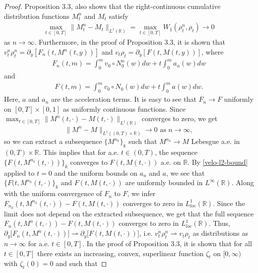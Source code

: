 \documentclass[11pt]{article}
\numberwithin{equation}{section}
\begin{document}
\begin{proof}
            Proposition 3.3, \cite{Tudorascu-2008} also shows that the right-continuous cumulative distribution functions $M_t^n$ and $M_t$ satisfy 
            \begin{align}\label{CDF-condition}
                \max_{t\in[0,T]}\|M_t^n-M_t\|_{L^1(\mathbb{R})}=\max_{t\in[0,T]}W_1(\rho_t^n,\rho_t)\to0
            \end{align}
            as $n\to\infty$. Furthermore, in the proof of Proposition 3.3, \cite{Tudorascu-2008} it is shown that $v_t^n\rho_t^n=\partial_y[{F}_n(t,M^n(t,y))]$ and $v_t\rho_t=\partial_y[{F}(t,M(t,y))]$, where 
            \begin{align*}
                {F}_n(t,m)=\int_0^m v_0\circ N_0^n(w)dw+t\int_0^ma_n(w)dw
            \end{align*}
            and
            \begin{align*}
                {F}(t,m)=\int_0^m v_0\circ N_0 (w)dw+t\int_0^ma(w)dw.
            \end{align*}
            Here, $a$ and $a_n$ are the acceleration terms.
            It is easy to see that ${F}_n\to{F}$ uniformly on $[0,T]\times[0,1]$ as uniformly continuous functions. 
            Since $\max_{t\in[0,T]}\|M^n(t,\cdot)-M(t,\cdot)\|_{L^1(\mathbb{R})}$ converges to zero, we get $$\|M^n-M\|_{L^1((0,T)\times\mathbb{R})}\rightarrow0\mbox{ as }n\rightarrow\infty,$$ 
            so we can extract a subsequence $\{M^{n_k}\}_k$ such that $M^{n_k}\rightarrow M$ Lebesgue a.e. in $(0,T)\times\mathbb{R}$. This implies that for a.e. $t\in(0,T)$, the sequence $\{F(t,M^{n_k}(t,\cdot))\}_k$ converges to $F(t,M(t,\cdot))$ a.e. on $\mathbb{R}$. By \eqref{velo-l2-bound} applied to $t=0$ and the uniform bounds on $a_n$ and $a$, we see that $\{F(t,M^{n_k}(t,\cdot)\}_k$ and $F(t,M(t,\cdot))$ are uniformly bounded in $L^\infty(\mathbb{R})$.
            Along with the uniform convergence of $F_n$ to $F$, we infer ${F}_{n_k}(t,M^{n_k}(t,\cdot))-{F}(t,M(t,\cdot))$ converges to zero in $L^1_{loc}(\mathbb{R})$. Since the limit does not depend on the extracted subsequence, we get that the full sequence ${F}_{n}(t,M^{n}(t,\cdot))-{F}(t,M(t,\cdot))$ converges to zero in $L^1_{loc}(\mathbb{R})$. Thus, $\partial_y\big[{F}_n(t,M^n(t,\cdot))\big]\rightharpoonup\partial_y\big[{F}(t,M(t,\cdot))\big]$, i.e. $v_t^n\rho_t^n\rightharpoonup v_t\rho_t$ as distributions as $n\to\infty$ for a.e. $t\in[0,T]$.  In the proof of Proposition 3.3, \cite{Tudorascu-2008} it is shown that for all $t\in[0,T]$ there exists an increasing, convex, superlinear function $\zeta_t$ on $[0,\infty)$ with $\zeta_t(0)=0$ and such that 

\end{proof}
\end{document}
